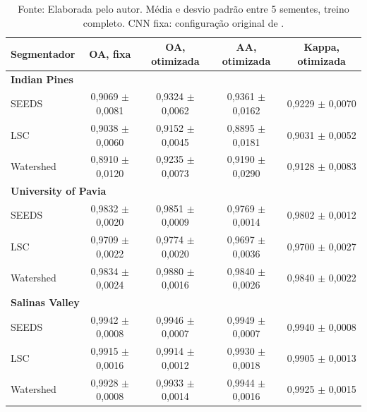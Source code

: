 \begin{table}[!htb]
    \centering
    \small
    \setlength{\tabcolsep}{4pt}
    \caption{Segmentadores com a CNN fixa (experimento 02) e com a CNN otimizada para cada um (experimento 03)}
    \begin{tabular}{|l|c|c|c|c|}
        \hline
        \rowcolor[HTML]{C0C0C0}
        \textbf{Segmentador} & \textbf{OA, fixa} & \textbf{OA, otimizada} & \textbf{AA, otimizada} & \textbf{Kappa, otimizada} \\
        \hline
        \multicolumn{5}{|l|}{\cellcolor[HTML]{EFEFEF}\textbf{Indian Pines}} \\ \hline
        SEEDS & 0,9069 $\pm$ 0,0081 & 0,9324 $\pm$ 0,0062 & 0,9361 $\pm$ 0,0162 & 0,9229 $\pm$ 0,0070 \\
        LSC & 0,9038 $\pm$ 0,0060 & 0,9152 $\pm$ 0,0045 & 0,8895 $\pm$ 0,0181 & 0,9031 $\pm$ 0,0052 \\
        Watershed & 0,8910 $\pm$ 0,0120 & 0,9235 $\pm$ 0,0073 & 0,9190 $\pm$ 0,0290 & 0,9128 $\pm$ 0,0083 \\ \hline
        \multicolumn{5}{|l|}{\cellcolor[HTML]{EFEFEF}\textbf{University of Pavia}} \\ \hline
        SEEDS & 0,9832 $\pm$ 0,0020 & 0,9851 $\pm$ 0,0009 & 0,9769 $\pm$ 0,0014 & 0,9802 $\pm$ 0,0012 \\
        LSC & 0,9709 $\pm$ 0,0022 & 0,9774 $\pm$ 0,0020 & 0,9697 $\pm$ 0,0036 & 0,9700 $\pm$ 0,0027 \\
        Watershed & 0,9834 $\pm$ 0,0024 & 0,9880 $\pm$ 0,0016 & 0,9840 $\pm$ 0,0026 & 0,9840 $\pm$ 0,0022 \\ \hline
        \multicolumn{5}{|l|}{\cellcolor[HTML]{EFEFEF}\textbf{Salinas Valley}} \\ \hline
        SEEDS & 0,9942 $\pm$ 0,0008 & 0,9946 $\pm$ 0,0007 & 0,9949 $\pm$ 0,0007 & 0,9940 $\pm$ 0,0008 \\
        LSC & 0,9915 $\pm$ 0,0016 & 0,9914 $\pm$ 0,0012 & 0,9930 $\pm$ 0,0018 & 0,9905 $\pm$ 0,0013 \\
        Watershed & 0,9928 $\pm$ 0,0008 & 0,9933 $\pm$ 0,0014 & 0,9944 $\pm$ 0,0016 & 0,9925 $\pm$ 0,0015 \\ \hline
    \end{tabular}
    \captionsetup{justification=raggedright}
    \caption*{Fonte: Elaborada pelo autor. Média e desvio padrão entre 5 sementes, treino completo. CNN fixa: configuração original de .}
    \label{tab:segmentadores}
\end{table}

